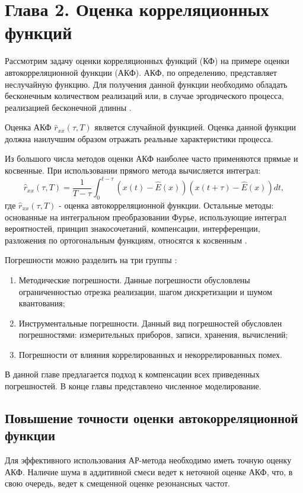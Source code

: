 \chapter*{Глава 2. Оценка корреляционных функций}
\label{l:sec_acf}

Рассмотрим задачу оценки корреляционных функций (КФ) на примере оценки автокорреляционной функции (АКФ). АКФ, по определению, представляет неслучайную функцию.
Для получения данной функции необходимо обладать бесконечным количеством реализаций или, в случае эргодического процесса, реализацией бесконечной длинны \cite{bolshakov-book}.

Оценка АКФ ${\hat{r}_{xx}(\tau, T)}$ является случайной функцией. Оценка данной функции должна наилучшим образом отражать реальные характеристики процесса.

Из большого числа методов оценки АКФ наиболее часто применяются прямые и косвенные. При использовании прямого метода вычисляется интеграл:
\begin{equation}
	\label{eq:acf_integral_basic}
	\hat{r}_{xx}(\tau, T) = \frac{1}{T-\tau} \int_{0}^{t-\tau} (x(t) - \hat{E}(x))(x(t+\tau) - \hat{E}(x))dt,
\end{equation}
где ${\hat{r}_{xx}(\tau, T)}$ -  оценка автокорреляционной функции. Остальные методы: основанные на интегральном преобразовании Фурье, использующие интеграл вероятностей, принцип
знакосочетаний, компенсации, интерференции, разложения по ортогональным функциям, относятся к косвенным \cite{bolshakov-book}.

Погрешности можно разделить на три группы \cite{bolshakov-book}:
\begin{enumerate}
	\item Методические погрешности. Данные погрешности обусловлены ограниченностью отрезка реализации, шагом дискретизации и шумом квантования;
	\item Инструментальные погрешности. Данный вид погрешностей обусловлен погрешностями: измерительных приборов, записи, хранения, вычислений;
	\item Погрешности от влияния коррелированных и некоррелированных помех.
\end{enumerate}

В данной главе предлагается подход к компенсации всех приведенных погрешностей. В конце главы представлено численное моделирование.

\section{Повышение точности оценки автокорреляционной функции}
Для эффективного использования АР-метода необходимо иметь точную оценку АКФ. Наличие шума в аддитивной смеси ведет к неточной
оценке АКФ, что, в свою очередь, ведет к смещенной оценке резонансных частот.

